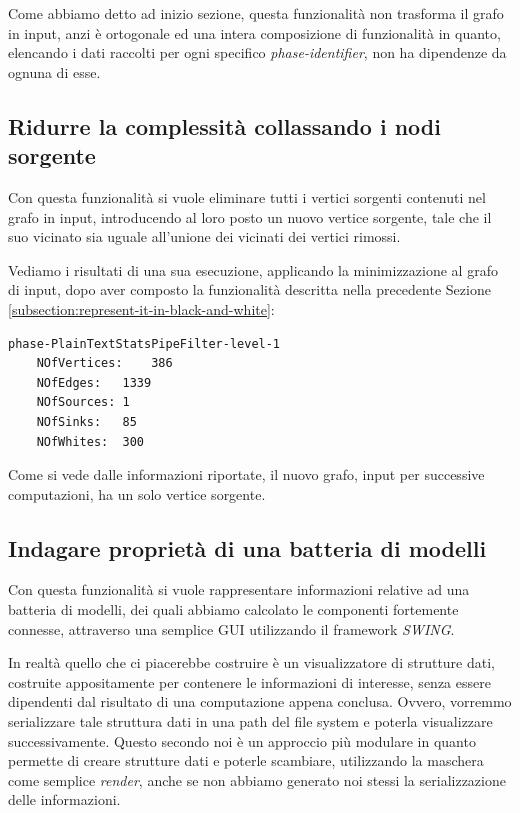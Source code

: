 Come abbiamo detto ad inizio sezione, questa funzionalit\`a non
trasforma il grafo in input, anzi \`e ortogonale ed una intera
composizione di funzionalit\`a in quanto, elencando i dati raccolti
per ogni specifico \emph{phase-identifier}, non ha dipendenze da
ognuna di esse.

\subsection{Ridurre la complessit\`a collassando i nodi sorgente}
Con questa funzionalit\`a si vuole eliminare tutti i vertici sorgenti
contenuti nel grafo in input, introducendo al loro posto un nuovo
vertice sorgente, tale che il suo vicinato sia uguale all'unione dei
vicinati dei vertici rimossi.

Vediamo i risultati di una sua esecuzione, applicando la
minimizzazione al grafo di input, dopo aver composto la funzionalit\`a
descritta nella precedente Sezione
\ref{subsection:represent-it-in-black-and-white}:
\begin{lstlisting}
phase-PlainTextStatsPipeFilter-level-1
	NOfVertices:	386
	NOfEdges:	1339
	NOfSources:	1
	NOfSinks:	85
	NOfWhites:	300
\end{lstlisting}
Come si vede dalle informazioni riportate, il nuovo grafo, input per
successive computazioni, ha un solo vertice sorgente.

\subsection{Indagare propriet\`a di una batteria di modelli}
\label{subsection:use-case-result-viewer}
Con questa funzionalit\`a si vuole rappresentare informazioni relative
ad una batteria di modelli, dei quali abbiamo calcolato le componenti
fortemente connesse, attraverso una semplice GUI utilizzando il
framework \emph{SWING}.

In realt\`a quello che ci piacerebbe costruire \`e un visualizzatore
di strutture dati, costruite appositamente per contenere le
informazioni di interesse, senza essere dipendenti dal risultato di
una computazione appena conclusa. Ovvero, vorremmo serializzare tale
struttura dati in una path del file system e poterla visualizzare
successivamente. Questo secondo noi \`e un approccio pi\`u modulare in
quanto permette di creare strutture dati e poterle scambiare,
utilizzando la maschera come semplice \emph{render}, anche se non
abbiamo generato noi stessi la serializzazione delle informazioni.

